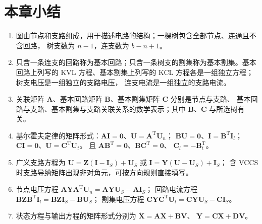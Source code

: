 \section{本章小结}
\begin{enumerate}
  \item 图由节点和支路组成，用于描述电路的结构；一棵树包含全部节点、连通且不含回路，
        树支数为 $n-1$，连支数为 $b-n+1$。
  \item 只含一条连支的回路称为基本回路；只含一条树支的割集称为基本割集。基本回路上列写的 KVL
        方程、基本割集上列写的 KCL 方程各是一组独立方程；树支电压是一组独立的支路电压，
        连支电流是一组独立的支路电流。
  \item 关联矩阵 $\boldsymbol{A}$、基本回路矩阵 $\boldsymbol{B}$、基本割集矩阵 $\boldsymbol{C}$ 分别是节点与支路、
        基本回路与支路、基本割集与支路关联关系的数学表示；其中 $\boldsymbol{B}$、$\boldsymbol{C}$ 与所选树有关。
  \item 基尔霍夫定律的矩阵形式：$\boldsymbol{A}\boldsymbol{I}=\boldsymbol{0}$、$\boldsymbol{U}=\boldsymbol{A}^{\mathrm{T}}\boldsymbol{U}_n$；
        $\boldsymbol{B}\boldsymbol{U}=\boldsymbol{0}$、$\boldsymbol{I}=\boldsymbol{B}^{\mathrm{T}}\boldsymbol{I}_l$；
        $\boldsymbol{C}\boldsymbol{I}=\boldsymbol{0}$、$\boldsymbol{U}=\boldsymbol{C}^{\mathrm{T}}\boldsymbol{U}_t$。
        且 $\boldsymbol{A}\boldsymbol{B}^{\mathrm{T}}=\boldsymbol{0}$、$\boldsymbol{B}\boldsymbol{C}^{\mathrm{T}}=\boldsymbol{0}$、
        $\boldsymbol{C}_l=-\boldsymbol{B}_t^{\mathrm{T}}$。
  \item 广义支路方程为 $\boldsymbol{U}=\boldsymbol{Z}(\boldsymbol{I}-\boldsymbol{I}_S)+\boldsymbol{U}_S$ 或
        $\boldsymbol{I}=\boldsymbol{Y}(\boldsymbol{U}-\boldsymbol{U}_S)+\boldsymbol{I}_S$；
        含 VCCS 时支路导纳矩阵出现非对角元，可按方向规则直接填写。
  \item 节点电压方程 $\boldsymbol{A}\boldsymbol{Y}\boldsymbol{A}^{\mathrm{T}}\boldsymbol{U}_n
        =\boldsymbol{A}\boldsymbol{Y}\boldsymbol{U}_S-\boldsymbol{A}\boldsymbol{I}_S$；
        回路电流方程 $\boldsymbol{B}\boldsymbol{Z}\boldsymbol{B}^{\mathrm{T}}\boldsymbol{I}_l
        =\boldsymbol{B}\boldsymbol{Z}\boldsymbol{I}_S-\boldsymbol{B}\boldsymbol{U}_S$；
        割集电压方程 $\boldsymbol{C}\boldsymbol{Y}\boldsymbol{C}^{\mathrm{T}}\boldsymbol{U}_t
        =\boldsymbol{C}\boldsymbol{Y}\boldsymbol{U}_S-\boldsymbol{C}\boldsymbol{I}_S$。
  \item 状态方程与输出方程的矩阵形式分别为 $\dot{\boldsymbol{X}}=\boldsymbol{A}\boldsymbol{X}+\boldsymbol{B}\boldsymbol{V}$、
        $\boldsymbol{Y}=\boldsymbol{C}\boldsymbol{X}+\boldsymbol{D}\boldsymbol{V}$。
\end{enumerate}

\endinput

